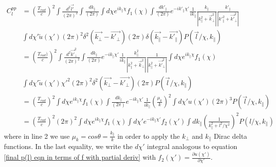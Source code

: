 \documentclass[12pt]{article}
\begin{document}
\begin{equation}\label{Cl with Pm(k)}
\begin{aligned}
C_l^{pp}&=\left(\frac{T_{rad} }{c}\right)^2\int \frac{d^2\vec{l'}}{(2\pi)^2}\int \frac{dk_\parallel}{(2\pi)}\int d\chi e^{ik_{\parallel}\chi}f_1(\chi) \int \frac{dk'_\parallel}{(2\pi)}e^{-ik'_\parallel \chi' }\frac{1}{ik_{\parallel}}\frac{k_\parallel}{\left|k^2_\parallel+\vec{k}^2_\perp\right|} \frac{k'_\parallel}{\left|k'^2_\parallel+\vec{k'}^2_\perp\right|}\\
&\int d\chi' \widetilde{u}(\chi') (2\pi)^2 \delta^2(\vec{k_{\bot}}-\vec{k'_\bot})(2\pi)\delta(\vec{k_\parallel}-\vec{k'_\parallel})P(\vec{l}/\chi,k_\parallel)
\\& =\left(\frac{T_{rad} )}{c}\right)^2\int \frac{d^2\vec{k'}_\perp^2}{(2\pi)^2}\int  \frac{dk_\parallel}{(2\pi)}e^{-ik_\parallel \chi'} \frac{1}{ik_{\parallel}}\frac{k^2_\parallel}{\left|k^2_\parallel+\vec{k}^2_\perp\right|} \frac{1}{\left|k^2_\parallel+\vec{k'}^2_\perp\right|}\int d\chi e^{ik_{\parallel}\chi}f_1(\chi)\\
&\int d\chi' \widetilde{u}(\chi') \chi'^2 (2\pi)^2 \delta^2(\vec{k_{\bot}}-\vec{k'_\bot})(2\pi)P(\vec{l}/\chi,k_\parallel)
\\&=\left(\frac{T_{rad} }{c}\right)^2 \int d\chi e^{ik_{\parallel}\chi}f_1(\chi) \int \frac{dk_\parallel}{(2\pi)}e^{-ik_\parallel \chi'} \frac{1}{ik_{\parallel}} \left(\frac{\mu_k}{k}\right)^2 \int d\chi'u(\chi') (2\pi)^3 P(\vec{l}/\chi,k_\parallel)\\
&=\left(\frac{T_{rad} }{c}\right)^2 (2\pi)^2 \int d\chi e^{ik_{\parallel}\chi}f_1(\chi) \int d\chi' e^{-ik_{\parallel}\chi'}f_2(\chi')\int dk_\parallel \left(\frac{1}{k^2_\parallel+l^2/\chi^2}\right)^2 P(l/\chi,k_\parallel)
\end{aligned}
\end{equation}
where in line 2 we use $\mu_k=cos\theta=\frac{k_\parallel}{k}$ in order to apply the $k_\perp$ and $k_\parallel$ Dirac delta functions. In the last equality, we write the $d\chi'$ integral analogous to equation \ref{final p(l) eqn in terms of f with partial deriv} with $f_2(\chi')=\frac{\partial u(\chi')}{\partial \chi'}$. 
\end{document}
